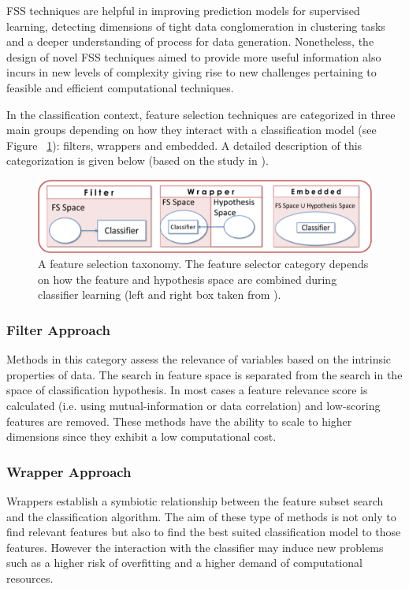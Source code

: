 FSS techniques are helpful in improving prediction models for supervised learning, detecting dimensions of tight data conglomeration in clustering tasks and a deeper understanding of process for data generation. Nonetheless, the design of novel FSS techniques aimed to provide more useful information also incurs in new levels of complexity giving rise to new challenges pertaining to feasible and efficient computational techniques.  

In the classification context, feature selection techniques are categorized in three main groups depending on how they interact with a classification model (see Figure ~\ref{fig:im09}):  filters, wrappers and embedded. A detailed description of this categorization is given below (based on the study in \cite{larranaga08}).

\begin{figure}[ht]
	\centering
		\includegraphics[scale=0.8]{Images/fss.png}
	\caption[A feature selection taxonomy.]%
	{A feature selection taxonomy.  The feature selector category depends on how the feature and hypothesis space are combined during classifier learning (left and right box taken from \cite{larranaga07}).}
	\label{fig:im09}
\end{figure}

\subsubsection{Filter Approach}
Methods in this category assess the relevance of variables based on the intrinsic properties of data.  The search in feature space is separated from the search in the space of classification hypothesis.  In most cases a feature relevance score is calculated (i.e. using mutual-information or data correlation) and low-scoring features are removed.  These methods have the ability to scale to higher dimensions since they exhibit a low computational cost.
\subsubsection{Wrapper Approach}
Wrappers establish a symbiotic relationship between the feature subset search and the classification algorithm.  The aim of these type of methods is not only to find relevant features but also to find the best suited classification model to those features.  However the interaction with the classifier may induce new problems such as a higher risk of overfitting and a higher demand of computational resources. 
